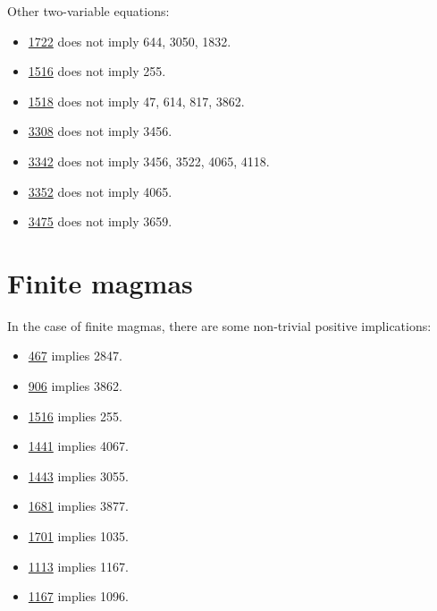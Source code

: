 Other two-variable equations:
\begin{itemize}
\item \href{https://teorth.github.io/equational_theories/implications/?1722}{1722} does not imply 644, 3050, 1832.
\item \href{https://teorth.github.io/equational_theories/implications/?1516}{1516} does not imply 255.
\item \href{https://teorth.github.io/equational_theories/implications/?1518}{1518} does not imply 47, 614, 817, 3862.
\item \href{https://teorth.github.io/equational_theories/implications/?3308}{3308} does not imply 3456.
\item \href{https://teorth.github.io/equational_theories/implications/?3342}{3342} does not imply 3456, 3522, 4065, 4118.
\item \href{https://teorth.github.io/equational_theories/implications/?3352}{3352} does not imply 4065.
\item \href{https://teorth.github.io/equational_theories/implications/?3475}{3475} does not imply 3659.
\end{itemize}

\section{Finite magmas}

In the case of finite magmas, there are some non-trivial positive implications:
\begin{itemize}
\item \href{https://teorth.github.io/equational_theories/implications/?467}{467} implies 2847.
\item \href{https://teorth.github.io/equational_theories/implications/?906}{906} implies 3862.
\item \href{https://teorth.github.io/equational_theories/implications/?1516}{1516} implies 255.
\item \href{https://teorth.github.io/equational_theories/implications/?1441}{1441} implies 4067.
\item \href{https://teorth.github.io/equational_theories/implications/?1443}{1443} implies 3055.
\item \href{https://teorth.github.io/equational_theories/implications/?1681}{1681} implies 3877.
\item \href{https://teorth.github.io/equational_theories/implications/?1701}{1701} implies 1035.
\item \href{https://teorth.github.io/equational_theories/implications/?1113}{1113} implies 1167.
\item \href{https://teorth.github.io/equational_theories/implications/?1167}{1167} implies 1096.
\end{itemize}

